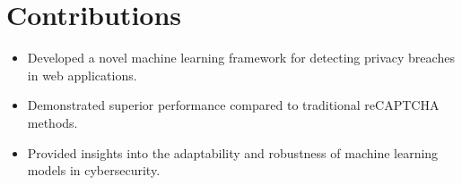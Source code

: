 \documentclass{article}
\begin{document}
\section{Contributions}
\begin{itemize}
    \item Developed a novel machine learning framework for detecting privacy breaches in web applications.
    \item Demonstrated superior performance compared to traditional reCAPTCHA methods.
    \item Provided insights into the adaptability and robustness of machine learning models in cybersecurity.
\end{itemize}



\end{document}
